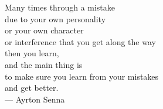 \whitepage
\thispagestyle{empty}

\vspace*{4cm}

\begin{raggedleft}
Many times through a mistake\\
due to your own personality\\
or your own character\\
or interference that you get along the way\\
then you learn,\\
and the main thing is\\
to make sure you learn from your mistakes\\
and get better.\\
\medskip
--- Ayrton Senna\\
\end{raggedleft}
